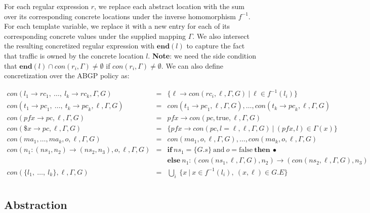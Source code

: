 \documentclass[twocolumn]{sig-alternate-10pt}
\begin{document}
For each regular expression $r$, we replace each abstract location with the sum over its corresponding concrete locations under the inverse homomorphism $f^{-1}$. For each template variable, we replace it with a new entry for each of its corresponding concrete values under the supplied mapping $\Gamma$. We also intersect the resulting concretized regular expression with $\textbf{end}(l)$ to capture the fact that traffic is owned by the concrete location $l$. \textbf{Note}: we need the side condition that $\textbf{end}(l) \cap con(r_i,\Gamma) \neq \emptyset$ if $con(r_i,\Gamma) \neq \emptyset$.
We can also define concretization over the ABGP policy as:

\[ \begin{array}{lcl}
     con(l_1 \rightarrow {rc}_1, ~\dots,~ l_k \rightarrow {rc}_k,\Gamma,G) 
        & = & 
        \{ \ell \rightarrow con(rc_i,\ell,\Gamma,G)  ~\vert~ \ell \in f^{-1}(l_i) \}
        \\
     con(t_1 \rightarrow {pc}_1, ~\dots,~ t_k \rightarrow {pc}_k,\ell,\Gamma,G) 
        & = &  
        con(t_1 \rightarrow {pc}_1,\ell,\Gamma,G), \dots, con(t_k \rightarrow {pc}_k,\ell,\Gamma,G)
        \\
     con(pfx \rightarrow {pc},\ell,\Gamma,G) 
        & = &  
        pfx \rightarrow con(pc,\text{true},\ell,\Gamma,G)
        \\
     con(\$x \rightarrow {pc},\ell,\Gamma,G) 
        & = &  
        \{ pfx \rightarrow con(pc, l=\ell, \ell,\Gamma,G) ~\vert~ (pfx, l) \in \Gamma(x) \}
        \\
     con(ma_1, \dots, ma_k,o,\ell,\Gamma,G) 
        & = &
        con(ma_1,o,\ell,\Gamma,G), \dots, con(ma_k,o,\ell,\Gamma,G)
        \\

     con(n_1 : ({ns}_1, n_2) \rightarrow ({ns}_2, n_3),o,\ell,\Gamma,G) 
        & = & \textbf{if}~ ns_1 = \{G.s\} ~\text{and}~ o = \text{false} ~\textbf{then}~ \bullet \\
        &   & \textbf{else}~ n_1 : ( con({ns}_1,\ell,\Gamma,G), n_2) \rightarrow (con({ns}_2,\ell,\Gamma,G),n_3)

        \\
     con(\{ l_1, ~\dots,~ l_k \}, \ell, \Gamma,G) 
        & = &  
        \bigcup_i ~ \{ x ~\vert~ x \in f^{-1}(l_i),~ (x,\ell) \in G.E \}
        \\
\end{array} \]

\subsection{Abstraction}
\end{document}
